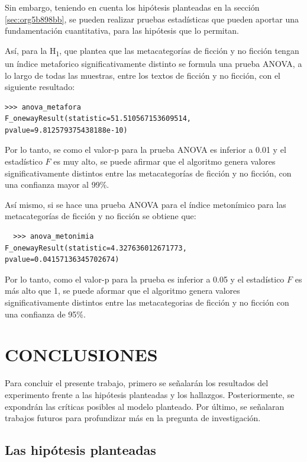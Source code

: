 \documentclass[12pt,letterpaper,twoside]{article}
\begin{document}
Sin embargo, teniendo en cuenta los hipótesis planteadas en la sección \ref{sec:org5b898bb},
se pueden realizar pruebas estadísticas que pueden aportar una fundamentación cuantitativa,
para las hipótesis que lo permitan.

Así, para la H\textsubscript{1}, que plantea que las metacategorías de ficción y no ficción tengan un
índice metaforico significativamente distinto se formula una prueba ANOVA, a lo largo de
todas las muestras, entre los textos de ficción y no ficción, con el siguiente resultado:

\begin{verbatim}
>>> anova_metafora
F_onewayResult(statistic=51.510567153609514, pvalue=9.812579375438188e-10)

\end{verbatim}

Por lo tanto, se como el valor-p para la prueba ANOVA es inferior a 0.01 y
el estadístico \(F\) es muy alto, se puede afirmar que el algoritmo genera valores
significativamente distintos entre las metacategorías de ficción y no ficción,
con una confianza mayor al 99\%.

Así mismo, si se hace una prueba ANOVA para el índice metonímico para las
metacategorías de ficción y no ficción se obtiene que:


\begin{verbatim}
  >>> anova_metonimia
F_onewayResult(statistic=4.327636012671773, pvalue=0.04157136345702674)

\end{verbatim}

Por lo tanto, como el valor-p para la prueba es inferior a 0.05 y el estadístico
\(F\) es más alto que 1, se puede aformar que el algoritmo genera valores
significativamente distintos entre las metacategorias de ficción y no ficción
con una confianza de 95\%.


\section{CONCLUSIONES}
\label{sec:org7f5f48c}

Para concluir el presente trabajo, primero se señalarán los resultados
del experimento frente a las hipótesis planteadas y los hallazgos.
Posteriormente, se expondrán las críticas posibles al modelo
planteado. Por último, se señalaran trabajos futuros para profundizar
más en la pregunta de investigación.

\subsection{Las hipótesis planteadas}
\label{sec:org36757f6}
\end{document}
